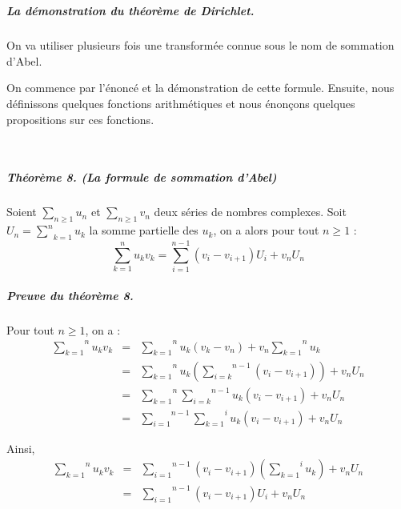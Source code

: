 \

\subparagraph{La d{\'e}monstration du th{\'e}or{\`e}me de Dirichlet.}

On va utiliser plusieurs fois une transform{\'e}e connue sous le nom de
sommation d'Abel.

On commence par l'{\'e}nonc{\'e} et la d{\'e}monstration de cette formule.
Ensuite, nous d{\'e}finissons quelques fonctions arithm{\'e}tiques et nous
{\'e}non{\c c}ons quelques propositions sur ces fonctions.

\

\subparagraph{Th{\'e}or{\`e}me 8. (La formule de sommation d'Abel)}

Soient $\underset{n \geqslant 1}{\sum} u_n$ et $\underset{n \geqslant 1}{\sum}
v_n$ deux s{\'e}ries de nombres complexes. Soit $U_n = \underset{k =
1}{\overset{n}{\sum}} u_k$ la somme partielle des $u_k$, on a alors pour tout
$n \geqslant 1$ :
\[ \overset{n}{\underset{k = 1}{\sum}} u_k v_k = \overset{n - 1}{\underset{i =
   1}{\sum}} (v_i - v_{i + 1}) U_i + v_n U_n \]


\subparagraph{Preuve du th{\'e}or{\`e}me 8.}


Pour tout $n \geqslant 1$, on a :
\begin{eqnarray*}
  \overset{n}{\underset{k = 1}{\sum}} u_k v_k & = & \overset{n}{\underset{k =
  1}{\sum}} u_k (v_k - v_n) + v_n \overset{n}{\underset{k = 1}{\sum}} u_k\\
  & = & \overset{n}{\underset{k = 1}{\sum}} u_k \left( \overset{n -
  1}{\underset{i = k}{\sum}} (v_i - v_{i + 1}) \right) + v_n U_n\\
  & = & \overset{n}{\underset{k = 1}{\sum}} \overset{n - 1}{\underset{i =
  k}{\sum}} u_k (v_i - v_{i + 1}) + v_n U_n\\
  & = & \overset{n - 1}{\underset{i = 1}{\sum}} \overset{i}{\underset{k =
  1}{\sum}} u_k (v_i - v_{i + 1}) + v_n U_n
\end{eqnarray*}


Ainsi,
\begin{eqnarray*}
  \overset{n}{\underset{k = 1}{\sum}} u_k v_k & = & \overset{n -
  1}{\underset{i = 1}{\sum}} (v_i - v_{i + 1}) \left( \overset{i}{\underset{k
  = 1}{\sum}} u_k \right) + v_n U_n\\
  & = & \overset{n - 1}{\underset{i = 1}{\sum}} (v_i - v_{i + 1}) U_i + v_n
  U_n
\end{eqnarray*}



